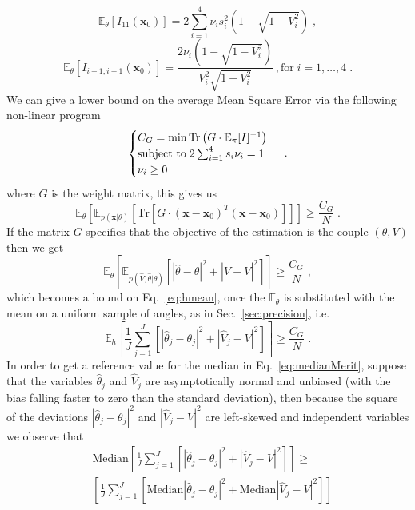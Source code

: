 \documentclass[aps, pra, 10pt, twocolumn, superscriptaddress,floatfix]{revtex4-1}
\DeclareMathOperator{\tr}{Tr}
\begin{document}
%
\begin{equation}
	\mathbb{E}_\theta [I_{11}(\boldsymbol{x}_0)] = 2 \sum_{i=1}^4 \nu_i s_i^2 \left( 1 - \sqrt{1-V_i^2}\right) \; ,
\end{equation}
%
\begin{equation}
	\mathbb{E}_\theta [I_{i+1, i+1}(\boldsymbol{x}_0)]= \frac{2 \nu_i \left( 1 - \sqrt{1-V_i^2} \right)}{V_i^2 \sqrt{1-V_i^2}}\, , \text{for} \; i=1, \dots, 4 \; .
\end{equation}
%
We can give a lower bound on the average Mean Square Error via the following non-linear program
%
\begin{equation}
	\begin{cases}
	C_G = \min \tr \left( G \cdot \mathbb{E}_\pi [ I]^{-1} \right)\\
	\text{subject to} \; 2 \sum_{i=1}^4 s_i \nu_i = 1 \\
	\nu_i \ge 0 
	\end{cases}\\
	\; .
\label{eq:semidefinite}
\end{equation}
%
where $G$ is the weight matrix, this gives us
%
\begin{equation}
	\mathbb{E}_\theta \left[ \mathbb{E}_{p(\boldsymbol{x}|\theta)} \left[ \text{Tr} \left[ G \cdot (\boldsymbol{x} - \boldsymbol{x}_0)^T  (\boldsymbol{x} - \boldsymbol{x}_0)  \right] \right] \right] \ge \frac{C_G}{N} \; .
	\label{eq:vanTrees}
\end{equation}
%
If the matrix $G$ specifies that the objective of the estimation is the couple $(\theta, V)$ then we get
%
\begin{equation}
	\mathbb{E}_\theta \left[ \mathbb{E}_{p(\hat{V}, \hat{\theta}|\theta)} [|\hat{\theta}-\theta|^2 + |\hat{V}-V|^2] \right] \ge \frac{C_G}{N} \; ,
\end{equation}
%
which becomes a bound on Eq.~\eqref{eq:hmean}, once the $\mathbb{E}_\theta$ is substituted with the mean on a uniform sample of angles, as in Sec.~\eqref{sec:precision}, i.e.
%
\begin{equation}
	\mathbb{E}_{h} \left[ \frac{1}{J} \sum_{j=1}^J  [|\hat{\theta}_j-\theta_j|^2 + |\hat{V}_j-V|^2] \right] \ge \frac{C_G}{N} \; . 
\end{equation}
%
In order to get a reference value for the median in Eq.~\eqref{eq:medianMerit}, suppose that the variables $\hat{\theta}_j$ and $\hat{V}_j$ are asymptotically normal and unbiased (with the bias falling faster to zero than the standard deviation), then because the square of the deviations $|\hat{\theta}_j-\theta_j|^2$ and $|\hat{V}_j-V|^2$ are left-skewed and independent variables we observe that
%
\begin{eqnarray}
	&\text{Median} \left[ \frac{1}{J} \sum_{j=1}^J  [|\hat{\theta}_j-\theta_j|^2 + |\hat{V}_j-V|^2] \right] \ge \\ &\left[ \frac{1}{J} \sum_{j=1}^J [ \text{Median} |\hat{\theta}_j-\theta_j|^2 + \text{Median} |\hat{V}_j-V|^2] \right] 
\end{eqnarray}
% 
\end{document}
